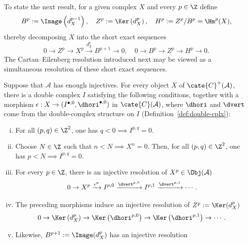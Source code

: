 To state the next result, for a given complex $X$ and every $p\in\Z$ define
\[ B^p := \Image\left( d_X^{p-1} \right), \quad Z^p := \Ker\left( d_X^p \right), \quad H^p := Z^p/B^p = \Hm^p(X) , \]
thereby decomposing $X$ into the short exact sequences
\[ 0 \to Z^p \to X^p \xrightarrow{d_X^p} B^{p+1} \to 0, \quad 0 \to B^p \to Z^p \to H^p \to 0. \]
The Cartan--Eilenberg resolution introduced next may be viewed as a simultaneous
resolution of these short exact sequences.

\begin{theorem}\label{prop:CE-resolution}
	Suppose that $\mathcal{A}$ has enough injectives. For every object $X$ of
	$\cate{C}^+(\mathcal{A})$, there is a double complex $I$ satisfying the
	following conditions, together with a morphism
	$\epsilon:X\to(I^{\bullet,0},\dhori^{\bullet,0})$ in
	$\cate{C}(\mathcal{A})$, where $\dhori$ and $\dvert$ come from the
	double-complex structure on $I$ (Definition~\ref{def:double-cplx}):
	\begin{enumerate}[(i)]
		\item For all $(p,q)\in\Z^2$, one has
		$q<0\implies I^{p,q}=0$.
		\item Choose $N\in\Z$ such that $n<N\implies X^n=0$. Then, for all
		$(p,q)\in\Z^2$, one has $p<N\implies I^{p,q}=0$.
		\item For every $p\in\Z$, there is an injective resolution of
		$X^p\in\Obj(\mathcal{A})$
		\[ 0 \to X^p \xrightarrow{\epsilon^p} I^{p, 0} \xrightarrow{\dvert^{p, 0}} I^{p, 1} \xrightarrow{\dvert^{p,1}} \cdots . \]
		\item The preceding morphisms induce an injective resolution of
		$Z^p:=\Ker(d_X^p)$
		\[ 0 \to \Ker\left( d_X^p \right) \to \Ker\left( \dhori^{p, 0} \right) \to \Ker\left( \dhori^{p, 1} \right) \to \cdots . \]
		\item Likewise, $B^{p+1}:=\Image(d_X^p)$ has an injective resolution

\end{enumerate}
\end{theorem}
